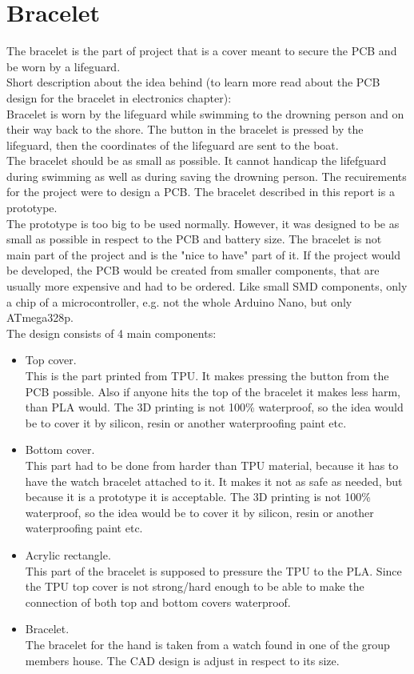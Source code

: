 \section{Bracelet}
The bracelet is the part of project that is a cover meant to secure the PCB and be worn by a lifeguard.\\
Short description about the idea behind (to learn more read about the PCB design for the bracelet in electronics chapter):\\
Bracelet is worn by the lifeguard while swimming to the drowning person and on their way back to the shore. The button in the bracelet 
is pressed by the lifeguard, then the coordinates of the lifeguard are sent to the boat.\\
The bracelet should be as small as possible. It cannot handicap the lifefguard during swimming as well as during saving the drowning person.
The recuirements for the project were to design a PCB. The bracelet described in this report is a prototype.\\
The prototype is too big to be used normally. However, it was designed to be as small as possible in respect to the PCB and battery size. 
The bracelet is not main part of the project and is the "nice to have" part of it. If the project would be developed, the PCB would be 
created from smaller components, that are usually more expensive and had to be ordered. Like small SMD components, only a chip of a 
microcontroller, e.g. not the whole Arduino Nano, but only ATmega328p.\\
The design consists of 4 main components:
\begin{itemize}
    \item Top cover.\\
     This is the part printed from TPU. It makes pressing the button from the PCB possible. Also if anyone hits the top
    of the bracelet it makes less harm, than PLA would. The 3D printing is not 100\% waterproof, so the idea would be to cover it by silicon, 
    resin or another waterproofing paint etc.
    \item Bottom cover. \\
    This part had to be done from harder than TPU material, because it has to have the watch bracelet attached to it.
    It makes it not as safe as needed, but because it is a prototype it is acceptable. The 3D printing is not 100\% waterproof, so the idea would be to cover it by silicon, 
    resin or another waterproofing paint etc.
    \item Acrylic rectangle. \\
    This part of the bracelet is supposed to pressure the TPU to the PLA. Since the TPU top cover is not strong/hard enough 
    to be able to make the connection of both top and bottom covers waterproof.
    \item Bracelet. \\
    The bracelet for the hand is taken from a watch found in one of the group members house. The CAD design is adjust in respect to its size.
\end{itemize}
